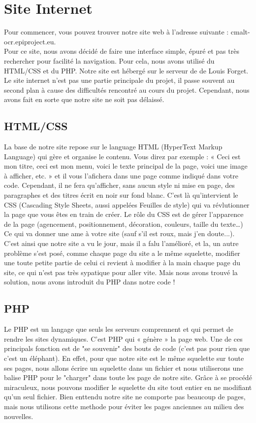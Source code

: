 \section{Site Internet}
Pour commencer, vous pouvez trouver notre site web à l'adresse suivante : cmalt-ocr.epiproject.eu.\\
Pour ce site, nous avons décidé de faire une interface simple, épuré et pas très rechercher pour facilité la navigation. Pour cela, nous avons utilisé du HTML/CSS et du PHP. Notre site est hébergé sur le serveur de de Louis Forget.\\
Le site internet n'est pas une partie principale du projet, il passe souvent au second plan à cause des difficultés rencontré au cours du projet. Cependant, nous avons fait en sorte que notre site ne soit pas délaissé.

\subsection{HTML/CSS}
La base de notre site repose sur le language HTML (HyperText Markup Language) qui gère et organise le contenu. Vous direz par exemple : « Ceci est mon titre, ceci est mon menu, voici le texte principal de la page, voici une image à afficher, etc. » et il vous l'afichera dans une page comme indiqué dans votre code. Cependant, il ne fera qu'afficher, sans aucun style ni mise en page, des paragraphes et des titres écrit en noir sur fond blanc. C'est là qu'intervient le CSS (Cascading Style Sheets, aussi appelées Feuilles de style) qui va révlutionner la page que vous êtes en train de créer. Le rôle du CSS est de gérer l'apparence de la page (agencement, positionnement, décoration, couleurs, taille du texte…) Ce qui va donner une ame à votre site (sauf s'il est roux, mais j'en doute...).\\

C'est ainsi que notre site a vu le jour, mais il a falu l'amélioré, et la, un autre problème s'est posé, comme chaque page du site a le même squelette, modifier une toute petite partie de celui ci revient à modifier à la main chaque page du site, ce qui n'est pas très sypatique pour aller vite. Mais nous avons trouvé la solution, nous avons introduit du PHP dans notre code !

\subsection{PHP}
Le PHP est un langage que seuls les serveurs comprennent et qui permet de rendre les sites dynamiques. C'est PHP qui « génère » la page web. Une de ces principals fonction est de "se souvenir" des bouts de code (c'est pas pour rien que c'est un éléphant). En effet, pour que notre site est le même squelette sur toute ses pages, nous allons écrire un squelette dans un fichier et nous utiliserons une balise PHP pour le "charger" dans toute les page de notre site. Grâce à se procédé miraculeux, nous pouvons modifier le squelette du site tout entier en ne modifiant qu'un seul fichier. Bien enttendu notre site ne comporte pas beaucoup de pages, mais nous utilisons cette methode pour éviter les pages anciennes au milieu des nouvelles.


